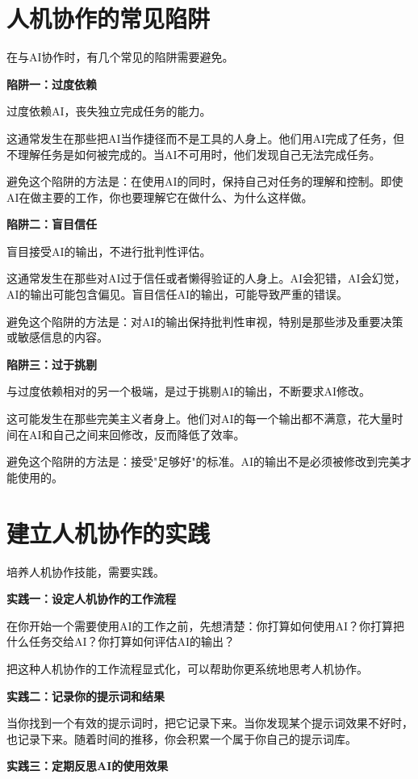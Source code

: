\section{人机协作的常见陷阱}


在与AI协作时，有几个常见的陷阱需要避免。

\textbf{陷阱一：过度依赖}

过度依赖AI，丧失独立完成任务的能力。

这通常发生在那些把AI当作捷径而不是工具的人身上。他们用AI完成了任务，但不理解任务是如何被完成的。当AI不可用时，他们发现自己无法完成任务。

避免这个陷阱的方法是：在使用AI的同时，保持自己对任务的理解和控制。即使AI在做主要的工作，你也要理解它在做什么、为什么这样做。

\textbf{陷阱二：盲目信任}

盲目接受AI的输出，不进行批判性评估。

这通常发生在那些对AI过于信任或者懒得验证的人身上。AI会犯错，AI会幻觉，AI的输出可能包含偏见。盲目信任AI的输出，可能导致严重的错误。

避免这个陷阱的方法是：对AI的输出保持批判性审视，特别是那些涉及重要决策或敏感信息的内容。

\textbf{陷阱三：过于挑剔}

与过度依赖相对的另一个极端，是过于挑剔AI的输出，不断要求AI修改。

这可能发生在那些完美主义者身上。他们对AI的每一个输出都不满意，花大量时间在AI和自己之间来回修改，反而降低了效率。

避免这个陷阱的方法是：接受"足够好"的标准。AI的输出不是必须被修改到完美才能使用的。

\section{建立人机协作的实践}


培养人机协作技能，需要实践。

\textbf{实践一：设定人机协作的工作流程}

在你开始一个需要使用AI的工作之前，先想清楚：你打算如何使用AI？你打算把什么任务交给AI？你打算如何评估AI的输出？

把这种人机协作的工作流程显式化，可以帮助你更系统地思考人机协作。

\textbf{实践二：记录你的提示词和结果}

当你找到一个有效的提示词时，把它记录下来。当你发现某个提示词效果不好时，也记录下来。随着时间的推移，你会积累一个属于你自己的提示词库。

\textbf{实践三：定期反思AI的使用效果}

